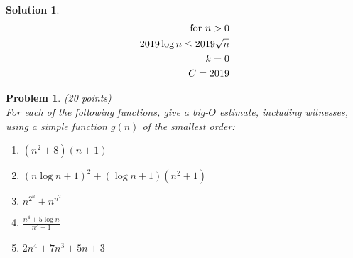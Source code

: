 \documentclass{article}
\theoremstyle{plain}
\newtheorem{problem}{Problem}
\theoremstyle{break}
\newtheorem{solution}{Solution}
\begin{document}
\begin{solution}
\begin{equation}
\begin{split}
\textnormal{ for } n  > 0 \\
2019\log{n} \leq 2019\sqrt{n} \\
k = 0\\
C = 2019\\
\end{split} 
\end{equation}

\end{solution}

\newpage

\begin{problem} (20 points)\\
For each of the following functions, give a big-$O$ estimate, including witnesses, using a simple function $g(n)$ of the smallest order:
\begin{enumerate}
\item $(n^2+8)(n+1)$
\item $(n\log{n} + 1)^2+(\log{n}+1)(n^2+1)$
\item $\displaystyle n^{2^n}+n^{n^2}$
\item $\displaystyle \frac{n^4+5\log{n}}{n^3+1}$
\item $2n^4+7n^3+5n+3$
\end{enumerate}
\end{problem}
\end{document}
